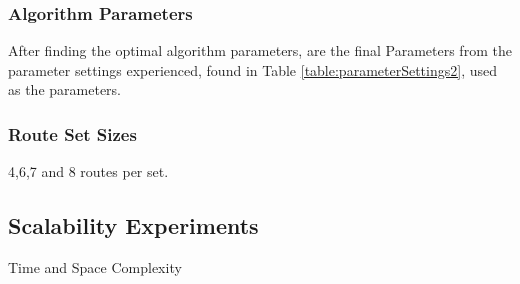 \subsubsection{Algorithm Parameters}
After finding the optimal algorithm parameters, are the final Parameters from the parameter settings experienced, found in Table \vref{table:parameterSettings2}, used as the parameters.

\subsubsection{Route Set Sizes}
4,6,7 and 8 routes per set.

\subsection{Scalability Experiments}
Time and Space Complexity
